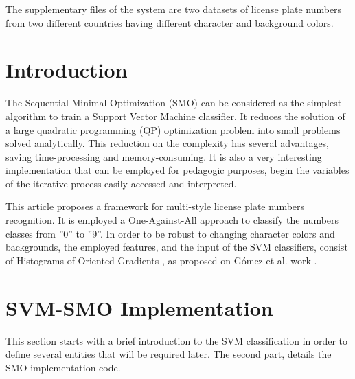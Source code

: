 \documentclass{ipol}
\begin{document}
\begin{ipolSupp}
The supplementary files of the system are two datasets of license plate numbers from two different countries having different character and background colors.
\end{ipolSupp}




\section{Introduction}

The Sequential Minimal Optimization (SMO) \cite{Platt:1998} can be considered as the simplest algorithm to train a Support Vector Machine classifier.
It reduces the solution of a large quadratic programming (QP) optimization problem into small problems solved analytically.
This reduction on the complexity has several advantages, saving time-processing and memory-consuming.
It is also a very interesting implementation that can be employed for pedagogic purposes, begin the variables of the iterative process easily accessed and interpreted.

This article proposes a framework for multi-style license plate numbers recognition.
It is employed a One-Against-All approach to classify the numbers classes from ''0'' to ''9''.
In order to be robust to changing character colors and backgrounds, the employed features, and the input of the SVM classifiers, consist of Histograms of Oriented Gradients \cite{Dalal:2005}, as proposed on G\'{o}mez et al. work \cite{Gomez:2011}.



\section{SVM-SMO Implementation}

This section starts with a brief introduction to the SVM classification in order to define several entities that will be required later.
The second part, details the SMO implementation code.
\end{document}
